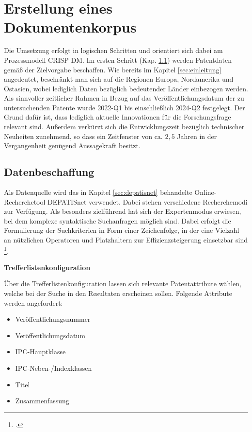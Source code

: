 \newpage
\section{Erstellung eines Dokumentenkorpus}
Die Umsetzung erfolgt in logischen Schritten und orientiert sich dabei am Prozessmodell \ac{CRISP-DM}. 
Im ersten Schritt (Kap. \ref{sec:data_ingestion}) werden Patentdaten gemäß der Zielvorgabe beschaffen. Wie bereits im Kapitel \ref{sec:einleitung} angedeutet, beschränkt man sich auf die Regionen Europa, Nordamerika und Ostasien, wobei lediglich Daten bezüglich bedeutender Länder einbezogen werden. Als sinnvoller zeitlicher Rahmen in Bezug auf das Veröffentlichungsdatum der zu untersuchenden Patente wurde 2022-Q1 bis einschließlich 2024-Q2 festgelegt. Der Grund dafür ist, dass lediglich aktuelle Innovationen für die Forschungsfrage relevant sind. Außerdem verkürzt sich die Entwicklungszeit bezüglich technischer Neuheiten zunehmend, so dass ein Zeitfenster von ca. $2,5$ Jahren in der Vergangenheit genügend Aussagekraft besitzt. 

\subsection{Datenbeschaffung}\label{sec:data_ingestion}
Als Datenquelle wird das in Kapitel \ref{sec:depatisnet} behandelte Online-Recherchetool DEPATISnet verwendet. Dabei stehen verschiedene Recherchemodi zur Verfügung. Als besonders zielführend hat sich der Expertenmodus erwiesen, bei dem komplexe syntaktische Suchanfragen möglich sind. Dabei erfolgt die Formulierung der Suchkriterien in Form einer Zeichenfolge, in der eine Vielzahl an nützlichen Operatoren und Platzhaltern zur Effizienzsteigerung einsetzbar sind \footcite[S. 10-15]{dpma_hilfe}.

\textbf{Trefferlistenkonfiguration}

Über die Trefferlistenkonfiguration lassen sich relevante Patentattribute wählen, welche bei der Suche in den Resultaten erscheinen sollen. Folgende Attribute werden angefordert: 
\begin{itemize}
	\item Veröffentlichungsnummer
	\item Veröffentlichungsdatum
	\item IPC-Hauptklasse
	\item IPC-Neben-/Indexklassen
	\item Titel
	\item Zusammenfassung
\end{itemize}

